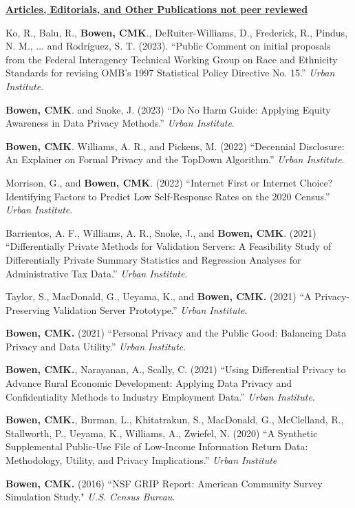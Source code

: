\vspace{4pt}
\noindent\underline{\textbf{Articles, Editorials, and Other Publications not peer reviewed}}
\vspace{4pt}
\begin{etaremune}[topsep=0pt, itemsep=5pt, partopsep=0pt, parsep=0pt]
    \item Ko, R., Balu, R., \textbf{Bowen, CMK}., DeRuiter-Williams, D., Frederick, R., Pindus, N. M., ... and Rodríguez, S. T. (2023). ``Public Comment on initial proposals from the Federal Interagency Technical Working Group on Race and Ethnicity Standards for revising OMB’s 1997 Statistical Policy Directive No. 15.'' \textit{Urban Institute}.

    \item \textbf{Bowen, CMK}. and Snoke, J. (2023) ``Do No Harm Guide: Applying Equity Awareness in Data Privacy Methods.'' \textit{Urban Institute}.

    \item \textbf{Bowen, CMK}. Williams, A. R., and Pickens, M. (2022) ``Decennial Disclosure: An Explainer on Formal Privacy and the TopDown Algorithm.'' \textit{Urban Institute}.
    
    \item Morrison, G., and \textbf{Bowen, CMK}. (2022) ``Internet First or Internet Choice? Identifying Factors to Predict Low Self-Response Rates on the 2020 Census.'' \textit{Urban Institute}.
    
    \item Barrientos, A. F., Williams, A. R., Snoke, J., and \textbf{Bowen, CMK}. (2021) ``Differentially Private Methods for Validation Servers: A Feasibility Study of Differentially Private Summary Statistics and Regression Analyses for Administrative Tax Data.'' \textit{Urban Institute}.
    
    \item Taylor, S., MacDonald, G., Ueyama, K., and \textbf{Bowen, CMK.} (2021) ``A Privacy-Preserving Validation Server Prototype.'' \textit{Urban Institute}.
        
    \item \textbf{Bowen, CMK.} (2021) ``Personal Privacy and the Public Good: Balancing Data Privacy and Data Utility.'' \textit{Urban Institute}.
    
    \item \textbf{Bowen, CMK.}, Narayanan, A., Scally, C. (2021) ``Using Differential Privacy to Advance Rural Economic Development: Applying Data Privacy and Confidentiality Methods to Industry Employment Data.'' \textit{Urban Institute}.
    
    \item \textbf{Bowen, CMK.}, Burman, L., Khitatrakun, S., MacDonald, G., McClelland, R., Stallworth, P., Ueyama, K., Williams, A., Zwiefel, N. (2020) ``A Synthetic Supplemental Public-Use File of Low-Income Information Return Data: Methodology, Utility, and Privacy Implications.'' \textit{Urban Institute}
    
    \item \textbf{Bowen, CMK.} (2016) ``NSF GRIP Report: American Community Survey Simulation Study." \textit{U.S. Census Bureau}.  
\end{etaremune}

